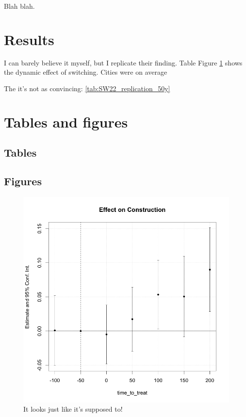 \documentclass{article}
\begin{document}
Blah blah.


\section{Results}

I can barely believe it myself, but I replicate their finding. Table 
Figure \ref{fig:SW_replication} shows the dynamic effect of switching. Cities were on average 

The it's not as convincing: \ref{tab:SW22_replication_50y}



\newpage
\onehalfspacing



\newpage
\section*{Tables and figures}

\subsection*{Tables}





\clearpage
\subsection*{Figures}

\begin{figure}
    \centering
    \includegraphics[scale = 0.4]{paper/output/regressions/SW22_replication_50y.png}
    \caption{It looks just like it's supposed to!}
    \label{fig:SW_replication}
\end{figure}
\end{document}

